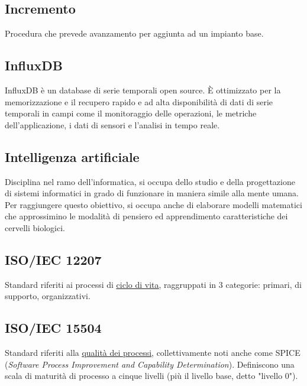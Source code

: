 \subsection{Incremento}
\label{sec:incremento}
Procedura che prevede avanzamento per aggiunta ad un impianto base.

\subsection{InfluxDB}
\label{sec:influxdb}
InfluxDB è un database di serie temporali open source. È ottimizzato per la memorizzazione e il recupero rapido e ad alta disponibilità di dati di serie temporali in campi come il monitoraggio delle operazioni, le metriche dell'applicazione, i dati di sensori e l'analisi in tempo reale.

\subsection{Intelligenza artificiale}
\label{sec:ia}
Disciplina nel ramo dell'informatica, si occupa dello studio e della progettazione di sistemi informatici in grado di funzionare in maniera simile alla mente umana. Per raggiungere questo obiettivo, si occupa anche di elaborare modelli matematici che approssimino le modalità di pensiero ed apprendimento caratteristiche dei cervelli biologici.


	\subsection{ISO/IEC 12207}
	\label{sec:iso12207}
	Standard riferiti ai processi di \underline{\hyperref[sec:ciclodivita]{ciclo di vita}}, raggruppati in 3 categorie: primari, di supporto, organizzativi.

	\subsection{ISO/IEC 15504}
	\label{sec:iso15504}
	Standard riferiti alla \underline{\hyperref[sec:qualitaprocessi]{qualità dei processi}}, collettivamente noti anche come SPICE (\emph{Software Process Improvement and Capability Determination}). Definiscono una scala di maturità di processo a cinque livelli (più il livello base, detto "livello 0").

